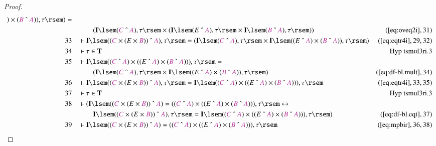 \begin{proof}
\begin{align}
      ) \times ( \mc{B} ~\string^~ \mc{A} ) ) , \tau \rsem )
      =  \notag \\ & & & \qquad
     ( \mathbf{I} \lsem ( \mc{C} ~\string^~ \mc{A} ) ,
      \tau \rsem \times ( \mathbf{I} \lsem ( E ~\string^~
      \mc{A} ) , \tau \rsem \times \mathbf{I} \lsem ( \mc{B}
      ~\string^~ \mc{A} ) , \tau \rsem )
      )&(\mbox{\ref{eq:oveq2i}},31)\notag
  \\ 33 &&  & \vdash \mathbf{I} \lsem ( ( \mc{C} \times ( E \times \mc{B} ) )
      ~\string^~ \mc{A} ) , \tau \rsem = ( \mathbf{I} \lsem
      ( \mc{C} ~\string^~ \mc{A} ) , \tau \rsem \times
      \mathbf{I} \lsem ( ( E ~\string^~ \mc{A} ) \times (
      \mc{B} ~\string^~ \mc{A} ) ) , \tau \rsem
      )&(\mbox{\ref{eq:eqtr4i}},29,32)\notag
  \\ 34 &&  & \vdash \tau \in
      \mathbf{T}&\text{Hyp~tsmul3ri.3}\notag%
  \\ 35 &&  & \vdash \mathbf{I} \lsem ( ( \mc{C} ~\string^~ \mc{A} ) \times ( (
      E ~\string^~ \mc{A} ) \times ( \mc{B} ~\string^~
      \mc{A} ) ) ) , \tau \rsem =  \notag \\ & & & \qquad
     ( \mathbf{I} \lsem (
      \mc{C} ~\string^~ \mc{A} ) , \tau \rsem \times
      \mathbf{I} \lsem ( ( E ~\string^~ \mc{A} ) \times (
      \mc{B} ~\string^~ \mc{A} ) ) , \tau \rsem
      )&(\mbox{\ref{eq:df-bl.mult}},34)\notag
  \\ 36 &&  & \vdash \mathbf{I} \lsem ( ( \mc{C} \times ( E \times \mc{B} ) )
      ~\string^~ \mc{A} ) , \tau \rsem = \mathbf{I} \lsem (
      ( \mc{C} ~\string^~ \mc{A} ) \times ( ( E ~\string^~
      \mc{A} ) \times ( \mc{B} ~\string^~ \mc{A} ) ) ) ,
      \tau \rsem&(\mbox{\ref{eq:eqtr4i}},33,35)\notag
  \\ 37 &&  & \vdash \tau \in
      \mathbf{T}&\text{Hyp~tsmul3ri.3}\notag%
  \\ 38 &&  & \vdash ( \mathbf{I} \lsem ( ( \mc{C} \times ( E \times \mc{B} ) )
      ~\string^~ \mc{A} ) = ( ( \mc{C} ~\string^~ \mc{A} )
      \times ( ( E ~\string^~ \mc{A} ) \times ( \mc{B}
      ~\string^~ \mc{A} ) ) ) , \tau \rsem \leftrightarrow  \notag \\ & & & \qquad
      \mathbf{I} \lsem ( ( \mc{C} \times ( E \times \mc{B} )
      ) ~\string^~ \mc{A} ) , \tau \rsem = \mathbf{I} \lsem
      ( ( \mc{C} ~\string^~ \mc{A} ) \times ( ( E ~\string^~
      \mc{A} ) \times ( \mc{B} ~\string^~ \mc{A} ) ) ) ,
      \tau \rsem )&(\mbox{\ref{eq:df-bl.eqt}},37)\notag
  \\ 39 &&  & \vdash \mathbf{I} \lsem ( ( \mc{C} \times ( E \times \mc{B} ) )
      ~\string^~ \mc{A} ) = ( ( \mc{C} ~\string^~ \mc{A} )
      \times ( ( E ~\string^~ \mc{A} ) \times ( \mc{B}
      ~\string^~ \mc{A} ) ) ) , \tau
      \rsem&(\mbox{\ref{eq:mpbir}},36,38)\notag
\end{align}
\end{proof}

